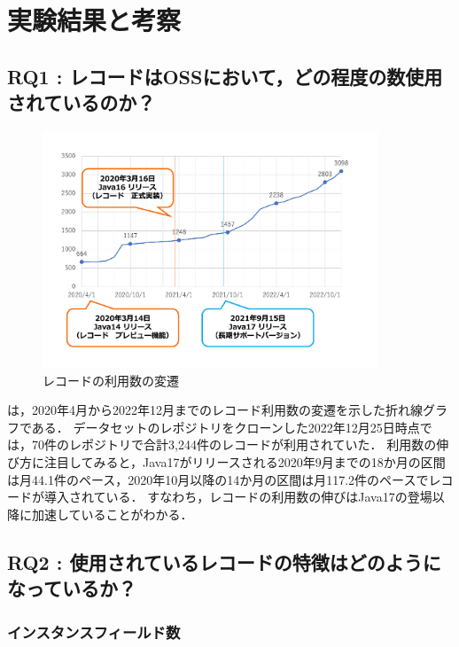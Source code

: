 \section{実験結果と考察\label{result}}

\subsection{RQ1 : レコードはOSSにおいて，どの程度の数使用されているのか？\label{rq1_result}}

\begin{figure}[t]
    \centering
    \includegraphics[width=10cm]{image/num_records.pdf}
    \caption{レコードの利用数の変遷}
    \label{num_records}
\end{figure}

は，2020年4月から2022年12月までのレコード利用数の変遷を示した折れ線グラフである．
データセットのレポジトリをクローンした2022年12月25日時点では，70件のレポジトリで合計3,244件のレコードが利用されていた．
利用数の伸び方に注目してみると，Java17がリリースされる2020年9月までの18か月の区間は月44.1件のペース，2020年10月以降の14か月の区間は月117.2件のペースでレコードが導入されている．
すなわち，レコードの利用数の伸びはJava17の登場以降に加速していることがわかる．

\subsection{RQ2 : 使用されているレコードの特徴はどのようになっているか？\label{rq2_result}}
\subsubsection{インスタンスフィールド数\label{num_instance_fields}}

